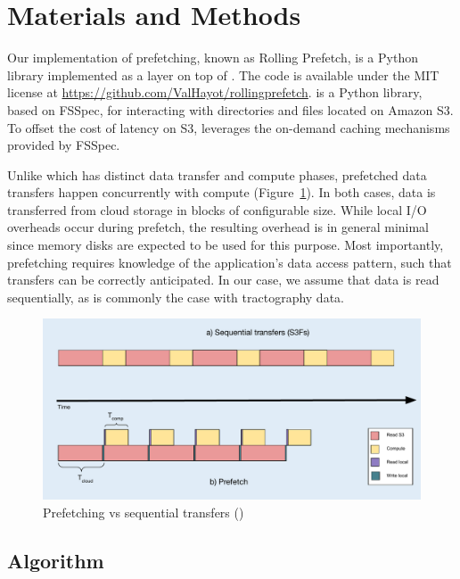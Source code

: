 \documentclass[conference]{IEEEtran}
\begin{document}
\section{Materials and Methods}

Our implementation of prefetching, known as Rolling Prefetch, is a Python library implemented as a layer on top of \sfs. The code is available under the MIT license at \url{https://github.com/ValHayot/rollingprefetch}.
\sfs is a Python library, based on FSSpec, for interacting with directories and files located on Amazon S3.
To offset the cost of latency on S3, \sfs leverages the on-demand caching mechanisms provided by FSSpec.

Unlike \sfs which has distinct data transfer and compute phases, prefetched data transfers happen concurrently with compute (Figure~\ref{fig:prefetch}). In both cases, data is transferred from cloud storage in blocks of configurable size. While local I/O overheads occur during prefetch, the resulting overhead is in general minimal since memory disks are expected to be used for this purpose. Most importantly, prefetching requires knowledge of the application's data access pattern, such that transfers can be correctly anticipated. In our case, we assume that data is read sequentially, as is commonly the case with tractography data.

\begin{figure}
\begin{center}
\includegraphics[width=\columnwidth]{figures/prefetch_diagram.pdf}
\end{center}
\caption{Prefetching vs sequential transfers (\sfs)}
\label{fig:prefetch}
\end{figure}

\subsection{Algorithm}
\end{document}
